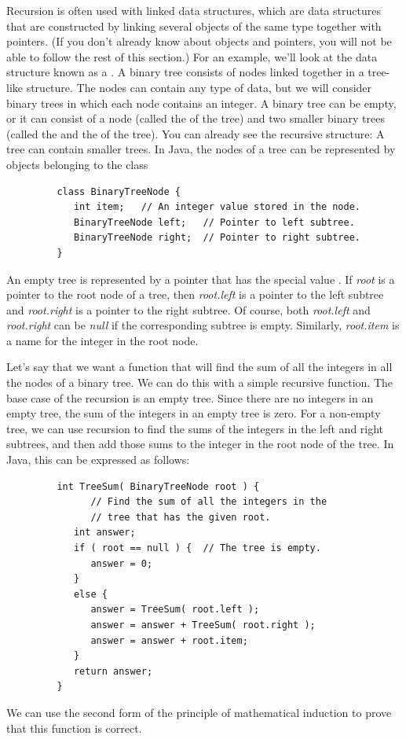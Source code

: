 Recursion is often used with linked data structures, which are
data structures that are constructed by linking several objects
of the same type together with pointers.  (If you don't already
know about objects and pointers, you will not be able to follow
the rest of this section.)  For an example, we'll look at
the data structure known as a .
A binary tree consists of nodes linked together in a tree-like
structure.  The nodes can contain any type of data, but we will
consider binary trees in which each node contains an integer.
A binary tree can be empty, or it can consist of a node (called
the  of the tree) and two smaller binary trees (called the
 and the  of the tree).
You can already see the recursive structure:  A tree can contain
smaller trees.  In Java, the nodes of a tree can be represented
by objects belonging to the class
\begin{verbatim}
         class BinaryTreeNode {
            int item;   // An integer value stored in the node.
            BinaryTreeNode left;   // Pointer to left subtree.
            BinaryTreeNode right;  // Pointer to right subtree.
         }
\end{verbatim}
An empty tree is represented by a pointer that has the special
value .  If \textit{root} is
a pointer to the root node of a tree, then \textit{root.left}
is a pointer to the left subtree and \textit{root.right} is a
pointer to the right subtree.  Of course, both \textit{root.left}
and \textit{root.right} can be \textit{null} if the corresponding
subtree is empty.  Similarly, \textit{root.item} is a name
for the integer in the root node.

Let's say that we want a function that will find the
sum of all the integers in all the nodes of a binary tree.
We can do this with a simple recursive function.  The base
case of the recursion is an empty tree.  Since there are no
integers in an empty tree, the sum of the integers in an
empty tree is zero.  For a non-empty tree, we can use recursion
to find the sums of the integers in the left and right subtrees,
and then add those sums to the integer in the root node of the
tree.  In Java, this can be expressed as follows:
\begin{verbatim}
         int TreeSum( BinaryTreeNode root ) {
               // Find the sum of all the integers in the
               // tree that has the given root.
            int answer;
            if ( root == null ) {  // The tree is empty.
               answer = 0;
            }
            else {
               answer = TreeSum( root.left );
               answer = answer + TreeSum( root.right );
               answer = answer + root.item;
            }
            return answer;
         }
\end{verbatim}
We can use the second form of the principle of mathematical induction
to prove that this function is correct.

